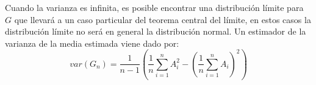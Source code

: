 \documentclass[../proyecto.tex]{memoir}
\begin{document}
Cuando la varianza es infinita, es posible encontrar una distribución límite para $G$ que llevará a un caso particular del teorema central del límite, en estos casos la distribución límite no será en general la distribución normal. Un estimador de la varianza de la media estimada viene dado por:
$$
var(G_n) = \frac{1}{n-1} \left( \frac{1}{n} \sum_{i=1}^n A_i^2 - \left( \frac{1}{n} \sum_{i=1}^n A_i \right)^2 \right)
$$
\end{document}
